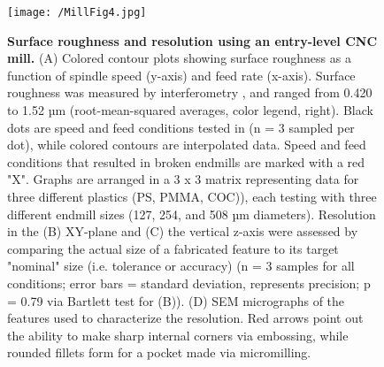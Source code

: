 \begin{figure}[ht!] %
\centering
\texttt{[image: /MillFig4.jpg]}
\caption{\textbf{Surface roughness and resolution using an entry-level CNC mill.} (A) Colored contour plots showing surface roughness as a function of spindle speed (y-axis) and feed rate (x-axis). Surface roughness was measured by interferometry , and ranged from 0.420 to 1.52 µm (root-mean-squared averages, color legend, right). Black dots are speed and feed conditions tested in (n = 3 sampled per dot), while colored contours are interpolated data. Speed and feed conditions that resulted in broken endmills are marked with a red "X". Graphs are arranged in a 3 x 3 matrix representing data for three different plastics (PS, PMMA, COC)), each testing with three different endmill sizes (127, 254, and 508 µm diameters). Resolution in the (B) XY-plane and (C) the vertical z-axis were assessed by comparing the actual size of a fabricated feature to its target "nominal" size (i.e. tolerance or accuracy) (n = 3 samples for all conditions; error bars = standard deviation, represents precision; p = 0.79 via Bartlett test for (B)). (D) SEM micrographs of the features used to characterize the resolution. Red arrows point out the ability to make sharp internal corners via embossing, while rounded fillets form for a pocket made via micromilling.}
\label{figure:MillFig4}
\end{figure}
\FloatBarrier


